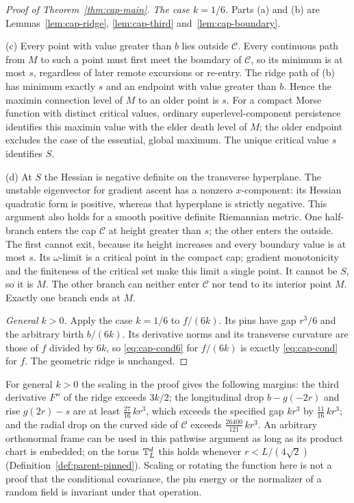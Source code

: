 \begin{proof}[Proof of Theorem~\ref{thm:cap-main}]
\emph{The case $k=1/6$.} Parts (a) and (b) are Lemmas~\ref{lem:cap-ridge}, \ref{lem:cap-third} and~\ref{lem:cap-boundary}.

(c) Every point with value greater than $b$ lies outside $\mathcal C$. Every continuous path from $M$ to such a point must first meet the boundary of $\mathcal C$, so its minimum is at most $s$, regardless of later remote excursions or re-entry. The ridge path of (b) has minimum exactly $s$ and an endpoint with value greater than $b$. Hence the maximin connection level of $M$ to an older point is $s$. For a compact Morse function with distinct critical values, ordinary superlevel-component persistence identifies this maximin value with the elder death level of $M$; the older endpoint excludes the case of the essential, global maximum. The unique critical value $s$ identifies $S$.

(d) At $S$ the Hessian is negative definite on the transverse hyperplane. The unstable eigenvector for gradient ascent has a nonzero $x$-component: its Hessian quadratic form is positive, whereas that hyperplane is strictly negative. This argument also holds for a smooth positive definite Riemannian metric. One half-branch enters the cap $\mathcal C$ at height greater than $s$; the other enters the outside. The first cannot exit, because its height increases and every boundary value is at most $s$. Its $\omega$-limit is a critical point in the compact cap; gradient monotonicity and the finiteness of the critical set make this limit a single point. It cannot be $S$, so it is $M$. The other branch can neither enter $\mathcal C$ nor tend to its interior point $M$. Exactly one branch ends at $M$.

\emph{General $k>0$.} Apply the case $k=1/6$ to $f/(6k)$. Its pins have gap $r^3/6$ and the arbitrary birth $b/(6k)$. Its derivative norms and its transverse curvature are those of $f$ divided by $6k$, so \eqref{eq:cap-cond6} for $f/(6k)$ is exactly \eqref{eq:cap-cond} for $f$. The geometric ridge is unchanged.
\end{proof}

\begin{remark}\label{rem:cap-margins}
For general $k>0$ the scaling in the proof gives the following margins: the third derivative $F''$ of the ridge exceeds $3k/2$; the longitudinal drop $b-g(-2r)$ and rise $g(2r)-s$ are at least $\frac{27}{16}\,kr^3$, which exceeds the specified gap $kr^3$ by $\frac{11}{16}\,kr^3$; and the radial drop on the curved side of $\mathcal C$ exceeds $\frac{26400}{121}\,kr^3$. An arbitrary orthonormal frame can be used in this pathwise argument as long as its product chart is embedded; on the torus $\mathbb T^d_L$ this holds whenever $r<L/(4\sqrt2)$ (Definition~\ref{def:parent-pinned}). Scaling or rotating the function here is not a proof that the conditional covariance, the pin energy or the normalizer of a random field is invariant under that operation.
\end{remark}
